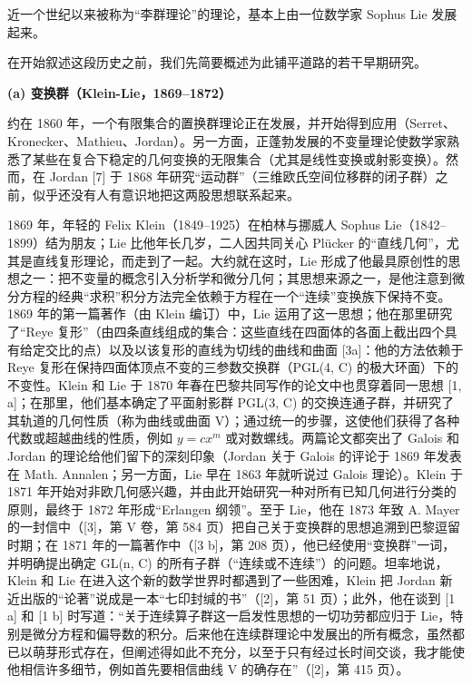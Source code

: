 
近一个世纪以来被称为“李群理论”的理论，基本上由一位数学家 Sophus Lie 发展起来。

在开始叙述这段历史之前，我们先简要概述为此铺平道路的若干早期研究。

\textbf{(a) 变换群（Klein-Lie，1869--1872）}

约在 1860 年，一个有限集合的置换群理论正在发展，并开始得到应用（Serret、Kronecker、Mathieu、Jordan）。另一方面，正蓬勃发展的不变量理论使数学家熟悉了某些在复合下稳定的几何变换的无限集合（尤其是线性变换或射影变换）。然而，在 Jordan {[}7{]} 于 1868 年研究“运动群”（三维欧氏空间位移群的闭子群）之前，似乎还没有人有意识地把这两股思想联系起来。

1869 年，年轻的 Felix Klein（1849--1925）在柏林与挪威人 Sophus Lie（1842--1899）结为朋友；Lie 比他年长几岁，二人因共同关心 Plücker 的“直线几何”，尤其是直线复形理论，而走到了一起。大约就在这时，Lie 形成了他最具原创性的思想之一：把不变量的概念引入分析学和微分几何；其思想来源之一，是他注意到微分方程的经典“求积”积分方法完全依赖于方程在一个“连续”变换族下保持不变。1869 年的第一篇著作（由 Klein 编订）中，Lie 运用了这一思想；他在那里研究了“Reye 复形”（由四条直线组成的集合：这些直线在四面体的各面上截出四个具有给定交比的点）以及以该复形的直线为切线的曲线和曲面 {[}3a{]}：他的方法依赖于 Reye 复形在保持四面体顶点不变的三参数交换群（PGL(4, C) 的极大环面）下的不变性。Klein 和 Lie 于 1870 年春在巴黎共同写作的论文中也贯穿着同一思想 {[}1, a{]}；在那里，他们基本确定了平面射影群 PGL(3, C) 的交换连通子群，并研究了其轨道的几何性质（称为曲线或曲面 V）；通过统一的步骤，这使他们获得了各种代数或超越曲线的性质，例如 \(y = cx^m\) 或对数螺线。两篇论文都突出了 Galois 和 Jordan 的理论给他们留下的深刻印象（Jordan 关于 Galois 的评论于 1869 年发表在 Math. Annalen；另一方面，Lie 早在 1863 年就听说过 Galois 理论）。Klein 于 1871 年开始对非欧几何感兴趣，并由此开始研究一种对所有已知几何进行分类的原则，最终于 1872 年形成“Erlangen 纲领”。至于 Lie，他在 1873 年致 A. Mayer 的一封信中（{[}3{]}，第 V 卷，第 584 页）把自己关于变换群的思想追溯到巴黎逗留时期；在 1871 年的一篇著作中（{[}3 b{]}，第 208 页），他已经使用“变换群”一词，并明确提出确定 GL(n, C) 的所有子群（“连续或不连续”）的问题。坦率地说，Klein 和 Lie 在进入这个新的数学世界时都遇到了一些困难，Klein 把 Jordan 新近出版的“论著”说成是一本“七印封缄的书”（{[}2{]}，第 51 页）；此外，他在谈到 {[}1 a{]} 和 {[}1 b{]} 时写道：“关于连续算子群这一启发性思想的一切功劳都应归于 Lie，特别是微分方程和偏导数的积分。后来他在连续群理论中发展出的所有概念，虽然都已以萌芽形式存在，但阐述得如此不充分，以至于只有经过长时间交谈，我才能使他相信许多细节，例如首先要相信曲线 V 的确存在”（{[}2{]}，第 415 页）。

